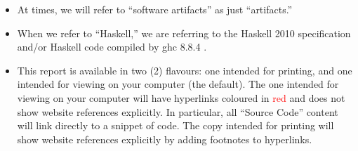 \begin{itemize}
      \item At times, we will refer to ``software artifacts'' as just
            ``artifacts.''

      \item When we refer to ``Haskell,'' we are referring to the Haskell 2010
            specification \cite{Haskell2010} and/or Haskell code compiled by
            \acs{ghc} 8.8.4 \cite{GHC884}.

      \item This report is available in two (2) flavours: one intended for
            printing, and one intended for viewing on your computer (the
            default). The one intended for viewing on your computer will have
            hyperlinks coloured in \textcolor{red}{red} and does not show
            website references explicitly. In particular, all ``Source Code''
            content will link directly to a snippet of code. The copy intended
            for printing will show website references explicitly by adding
            footnotes to hyperlinks.

\end{itemize}
